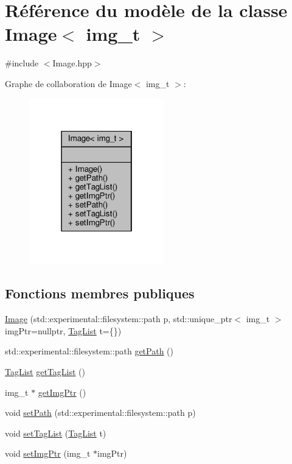 \hypertarget{class_image}{}\section{Référence du modèle de la classe Image$<$ img\+\_\+t $>$}
\label{class_image}


{\ttfamily \#include $<$Image.\+hpp$>$}



Graphe de collaboration de Image$<$ img\+\_\+t $>$\+:\nopagebreak
\begin{figure}[H]
\begin{center}
\leavevmode
\includegraphics[width=166pt]{class_image__coll__graph}
\end{center}
\end{figure}
\subsection*{Fonctions membres publiques}
\begin{DoxyCompactItemize}
\item 
\hyperlink{class_image_abc511289078a75b6565adaa1c697b2b8}{Image} (std\+::experimental\+::filesystem\+::path p, std\+::unique\+\_\+ptr$<$ img\+\_\+t $>$ img\+Ptr=nullptr, \hyperlink{_tag_list_8hpp_ac0222328791bb6c859b87ac65d5e9f65}{Tag\+List} t=\{\})
\item 
std\+::experimental\+::filesystem\+::path \hyperlink{class_image_a0f940439733c6b4e65f192400119e6d2}{get\+Path} ()
\item 
\hyperlink{_tag_list_8hpp_ac0222328791bb6c859b87ac65d5e9f65}{Tag\+List} \hyperlink{class_image_a35c662168b7b44e9372993691d422ad2}{get\+Tag\+List} ()
\item 
img\+\_\+t $\ast$ \hyperlink{class_image_a368ba28239858cff26afe25c0101d7bb}{get\+Img\+Ptr} ()
\item 
void \hyperlink{class_image_ad7a712265f2243a3292e763b964110b8}{set\+Path} (std\+::experimental\+::filesystem\+::path p)
\item 
void \hyperlink{class_image_a33cfdb0bb6a86aa10fa1f9bf62dbb236}{set\+Tag\+List} (\hyperlink{_tag_list_8hpp_ac0222328791bb6c859b87ac65d5e9f65}{Tag\+List} t)
\item 
void \hyperlink{class_image_aa21c33b7da565d5b4576c5e56ba08cac}{set\+Img\+Ptr} (img\+\_\+t $\ast$img\+Ptr)
\end{DoxyCompactItemize}


